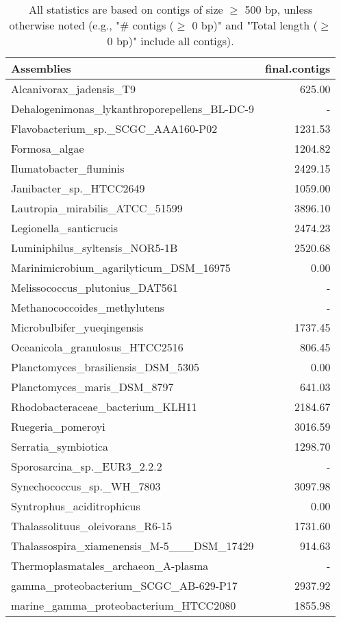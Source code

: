 \documentclass[12pt,a4paper]{article}
\begin{document}
\begin{table}[ht]
\begin{center}
\caption{All statistics are based on contigs of size $\geq$ 500 bp, unless otherwise noted (e.g., "\# contigs ($\geq$ 0 bp)" and "Total length ($\geq$ 0 bp)" include all contigs).}
\begin{tabular}{|l*{1}{|r}|}
\hline
Assemblies & final.contigs \\ \hline
Alcanivorax\_jadensis\_T9 & 625.00 \\ \hline
Dehalogenimonas\_lykanthroporepellens\_BL-DC-9 & - \\ \hline
Flavobacterium\_sp.\_SCGC\_AAA160-P02 & 1231.53 \\ \hline
Formosa\_algae & 1204.82 \\ \hline
Ilumatobacter\_fluminis & 2429.15 \\ \hline
Janibacter\_sp.\_HTCC2649 & 1059.00 \\ \hline
Lautropia\_mirabilis\_ATCC\_51599 & 3896.10 \\ \hline
Legionella\_santicrucis & 2474.23 \\ \hline
Luminiphilus\_syltensis\_NOR5-1B & 2520.68 \\ \hline
Marinimicrobium\_agarilyticum\_DSM\_16975 & 0.00 \\ \hline
Melissococcus\_plutonius\_DAT561 & - \\ \hline
Methanococcoides\_methylutens & - \\ \hline
Microbulbifer\_yueqingensis & 1737.45 \\ \hline
Oceanicola\_granulosus\_HTCC2516 & 806.45 \\ \hline
Planctomyces\_brasiliensis\_DSM\_5305 & 0.00 \\ \hline
Planctomyces\_maris\_DSM\_8797 & 641.03 \\ \hline
Rhodobacteraceae\_bacterium\_KLH11 & 2184.67 \\ \hline
Ruegeria\_pomeroyi & 3016.59 \\ \hline
Serratia\_symbiotica & 1298.70 \\ \hline
Sporosarcina\_sp.\_EUR3\_2.2.2 & - \\ \hline
Synechococcus\_sp.\_WH\_7803 & 3097.98 \\ \hline
Syntrophus\_aciditrophicus & 0.00 \\ \hline
Thalassolituus\_oleivorans\_R6-15 & 1731.60 \\ \hline
Thalassospira\_xiamenensis\_M-5\_\_\_DSM\_17429 & 914.63 \\ \hline
Thermoplasmatales\_archaeon\_A-plasma & - \\ \hline
gamma\_proteobacterium\_SCGC\_AB-629-P17 & 2937.92 \\ \hline
marine\_gamma\_proteobacterium\_HTCC2080 & 1855.98 \\ \hline
\end{tabular}
\end{center}
\end{table}
\end{document}

